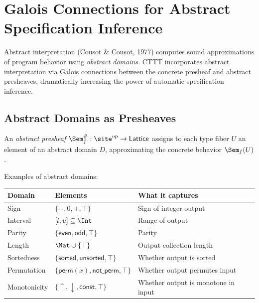 
\chapter{Galois Connections for Abstract Specification Inference}
\label{ch:galois}

Abstract interpretation (Cousot \& Cousot, 1977) computes sound
approximations of program behavior using \emph{abstract domains}.
CTTT incorporates abstract interpretation via Galois connections
between the concrete presheaf and abstract presheaves, dramatically
increasing the power of automatic specification inference.

\section{Abstract Domains as Presheaves}

\begin{definition}
An \emph{abstract presheaf} $\Sem_f^\# : \site^{\mathrm{op}} \to
\mathsf{Lattice}$ assigns to each type fiber $U$ an element of an
abstract domain $D$, approximating the concrete behavior
$\Sem_f(U)$.

Examples of abstract domains:
\begin{center}
\begin{tabular}{l l l}
  \textbf{Domain} & \textbf{Elements} & \textbf{What it captures} \\
  \hline
  Sign & $\{-, 0, +, \top\}$ & Sign of integer output \\
  Interval & $[l, u] \subseteq \Int$ & Range of output \\
  Parity & $\{\mathsf{even}, \mathsf{odd}, \top\}$ & Parity \\
  Length & $\Nat \cup \{\top\}$ & Output collection length \\
  Sortedness & $\{\mathsf{sorted}, \mathsf{unsorted}, \top\}$ &
    Whether output is sorted \\
  Permutation & $\{\mathsf{perm}(x), \mathsf{not\_perm}, \top\}$ &
    Whether output permutes input \\
  Monotonicity & $\{\uparrow, \downarrow, \mathsf{const}, \top\}$ &
    Whether output is monotone in input \\
\end{tabular}
\end{center}
\end{definition}

